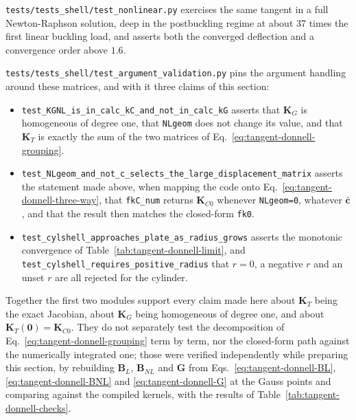 \texttt{tests/tests\_shell/test\_nonlinear.py} exercises the same tangent in a full Newton-Raphson solution, deep in the postbuckling regime at about 37 times the first linear buckling load, and asserts both the converged deflection and a convergence order above $1.6$.

\texttt{tests/tests\_shell/test\_argument\_validation.py} pins the argument handling around these matrices, and with it three claims of this section:

\begin{itemize}
	\item \texttt{test\_KGNL\_is\_in\_calc\_kC\_and\_not\_in\_calc\_kG} asserts that $\boldsymbol{K}_G$ is homogeneous of degree one, that \texttt{NLgeom} does not change its value, and that $\boldsymbol{K}_T$ is exactly the sum of the two matrices of Eq.~\ref{eq:tangent-donnell-grouping}.
	\item \texttt{test\_NLgeom\_and\_not\_c\_selects\_the\_large\_displacement\_matrix} asserts the statement made above, when mapping the code onto Eq.~\ref{eq:tangent-donnell-three-way}, that \texttt{fkC\_num} returns $\boldsymbol{K}_{C0}$ whenever \texttt{NLgeom=0}, whatever $\bar{\boldsymbol{c}}$, and that the result then matches the closed-form \texttt{fk0}.
	\item \texttt{test\_cylshell\_approaches\_plate\_as\_radius\_grows} asserts the monotonic convergence of Table~\ref{tab:tangent-donnell-limit}, and \texttt{test\_cylshell\_requires\_positive\_radius} that $r = 0$, a negative $r$ and an unset $r$ are all rejected for the cylinder.
\end{itemize}

Together the first two modules support every claim made here about $\boldsymbol{K}_T$ being the exact Jacobian, about $\boldsymbol{K}_G$ being homogeneous of degree one, and about $\boldsymbol{K}_T(\boldsymbol{0}) = \boldsymbol{K}_{C0}$. They do not separately test the decomposition of Eq.~\ref{eq:tangent-donnell-grouping} term by term, nor the closed-form path against the numerically integrated one; those were verified independently while preparing this section, by rebuilding $\boldsymbol{B}_L$, $\boldsymbol{B}_{NL}$ and $\boldsymbol{G}$ from Eqs.~\ref{eq:tangent-donnell-BL}, \ref{eq:tangent-donnell-BNL} and \ref{eq:tangent-donnell-G} at the Gauss points and comparing against the compiled kernels, with the results of Table~\ref{tab:tangent-donnell-checks}.

